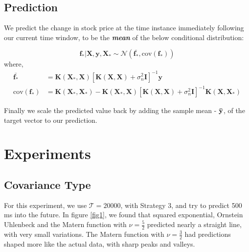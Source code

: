 \documentclass{article} %
\begin{document}
\subsection{Prediction}

We predict the change in stock price at the time instance immediately following our current time window, to be the \textbf{\textit{mean}} of the below conditional distribution:

\begin{equation}
 \boldsymbol{f_*} | \boldsymbol{X}, \boldsymbol{y}, \boldsymbol{X_*} \sim \mathcal{N}\left(\bar{\boldsymbol{f_*}}, \mbox{cov}(\boldsymbol{f_*})\right)
\end{equation}
where,
\begin{align}
\bar{\boldsymbol{f_*}} &= \boldsymbol{K}\left(\boldsymbol{X_*}, \boldsymbol{X}\right) \left[ \boldsymbol{K}\left(\boldsymbol{X}, \boldsymbol{X}\right) + \sigma_n^2\boldsymbol{I}\right]^{-1} \boldsymbol{y} \\
\mbox{cov}(\boldsymbol{f_*}) &= \boldsymbol{K}\left(\boldsymbol{X_*}, \boldsymbol{X_*}\right) - \boldsymbol{K}\left(\boldsymbol{X_*}, \boldsymbol{X}\right) \left[ \boldsymbol{K}\left(\boldsymbol{X}, \boldsymbol{X}\right) + \sigma_n^2\boldsymbol{I}\right]^{-1} \boldsymbol{K}\left(\boldsymbol{X}, \boldsymbol{X_*}\right)
\end{align}

Finally we scale the predicted value back by adding the sample mean - $\bf\bar{y}$, of the target vector to our prediction.

\section{Experiments}

\subsection{Covariance Type}
For this experiment, we use $\mathcal{T} = 20000$, with Strategy 3, and try to predict 500 ms into the future.
In figure \ref{fig1}, we found that squared exponential, Ornstein Uhlenbeck and the Matern function with $\nu = \frac{5}{2}$ predicted nearly a straight line, with very small variations.
The Matern function with $\nu = \frac{3}{2}$ had predictions shaped more like the actual data, with sharp peaks and valleys.
\end{document}
